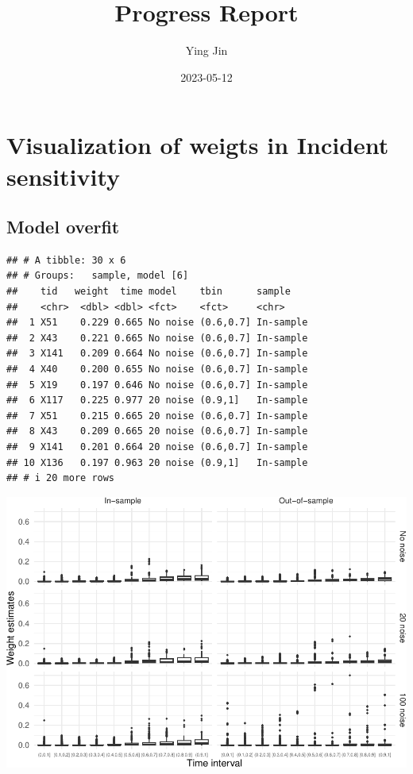 \documentclass[
]{article}
\title{Progress Report}
\author{Ying Jin}
\date{2023-05-12}
\begin{document}
\maketitle

{
\setcounter{tocdepth}{3}
\tableofcontents
}
\hypertarget{visualization-of-weigts-in-incident-sensitivity}{%
\section{Visualization of weigts in Incident
sensitivity}\label{visualization-of-weigts-in-incident-sensitivity}}

\hypertarget{model-overfit}{%
\subsection{Model overfit}\label{model-overfit}}

\begin{verbatim}
## # A tibble: 30 x 6
## # Groups:   sample, model [6]
##    tid   weight  time model    tbin      sample   
##    <chr>  <dbl> <dbl> <fct>    <fct>     <chr>    
##  1 X51    0.229 0.665 No noise (0.6,0.7] In-sample
##  2 X43    0.221 0.665 No noise (0.6,0.7] In-sample
##  3 X141   0.209 0.664 No noise (0.6,0.7] In-sample
##  4 X40    0.200 0.655 No noise (0.6,0.7] In-sample
##  5 X19    0.197 0.646 No noise (0.6,0.7] In-sample
##  6 X117   0.225 0.977 20 noise (0.9,1]   In-sample
##  7 X51    0.215 0.665 20 noise (0.6,0.7] In-sample
##  8 X43    0.209 0.665 20 noise (0.6,0.7] In-sample
##  9 X141   0.201 0.664 20 noise (0.6,0.7] In-sample
## 10 X136   0.197 0.963 20 noise (0.9,1]   In-sample
## # i 20 more rows
\end{verbatim}

\includegraphics{ProgressReport_files/figure-latex/boxp_wt_noise-1.pdf}
\end{document}
